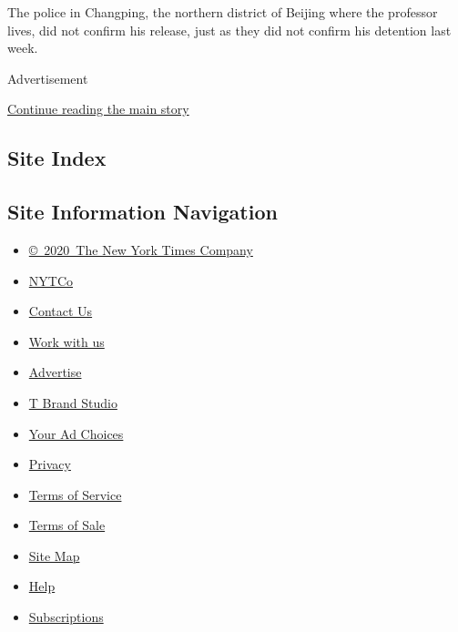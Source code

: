The police in Changping, the northern district of Beijing where the
professor lives, did not confirm his release, just as they did not
confirm his detention last week.

Advertisement

\protect\hyperlink{after-bottom}{Continue reading the main story}

\hypertarget{site-index}{%
\subsection{Site Index}\label{site-index}}

\hypertarget{site-information-navigation}{%
\subsection{Site Information
Navigation}\label{site-information-navigation}}

\begin{itemize}
\tightlist
\item
  \href{https://help.nytimes3xbfgragh.onion/hc/en-us/articles/115014792127-Copyright-notice}{©~2020~The
  New York Times Company}
\end{itemize}

\begin{itemize}
\tightlist
\item
  \href{https://www.nytco.com/}{NYTCo}
\item
  \href{https://help.nytimes3xbfgragh.onion/hc/en-us/articles/115015385887-Contact-Us}{Contact
  Us}
\item
  \href{https://www.nytco.com/careers/}{Work with us}
\item
  \href{https://nytmediakit.com/}{Advertise}
\item
  \href{http://www.tbrandstudio.com/}{T Brand Studio}
\item
  \href{https://www.nytimes3xbfgragh.onion/privacy/cookie-policy\#how-do-i-manage-trackers}{Your
  Ad Choices}
\item
  \href{https://www.nytimes3xbfgragh.onion/privacy}{Privacy}
\item
  \href{https://help.nytimes3xbfgragh.onion/hc/en-us/articles/115014893428-Terms-of-service}{Terms
  of Service}
\item
  \href{https://help.nytimes3xbfgragh.onion/hc/en-us/articles/115014893968-Terms-of-sale}{Terms
  of Sale}
\item
  \href{https://spiderbites.nytimes3xbfgragh.onion}{Site Map}
\item
  \href{https://help.nytimes3xbfgragh.onion/hc/en-us}{Help}
\item
  \href{https://www.nytimes3xbfgragh.onion/subscription?campaignId=37WXW}{Subscriptions}
\end{itemize}

